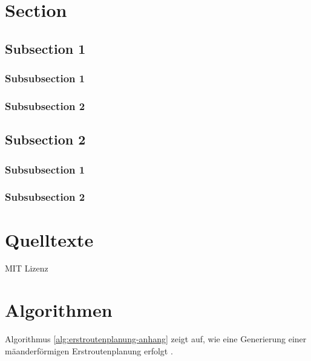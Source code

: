 \label{chap:anhang}

\section{Section}

\subsection{Subsection 1}
\subsubsection{Subsubsection 1}
\subsubsection{Subsubsection 2}

\subsection{Subsection 2}
\subsubsection{Subsubsection 1}
\subsubsection{Subsubsection 2}

\section{Quelltexte}
\label{sec:quelltexte}


\begin{code}
  
  \caption{MIT Lizenz}
  \label{lst:mitlizenz}
\end{code}


\section{Algorithmen}

Algorithmus \ref{alg:erstroutenplanung-anhang} zeigt auf, wie eine Generierung einer mäanderförmigen Erstroutenplanung erfolgt \citep[S.~42]{Bachelorthesis.2016}.

